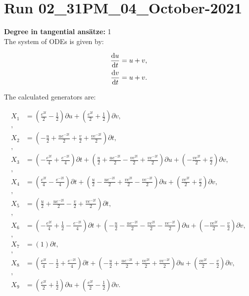\section*{Run 02\_31PM\_04\_October-2021}
\textbf{Degree in tangential ansätze:}	1\\
The system of ODEs is given by:

\begin{align*}
\dv{u}{t}&=u + v,\\
\dv{v}{t}&=u + v.\\
\end{align*}

\noindent The calculated generators are:

\begin{align*}
X_{1}&=\left( \frac{e^{2 t}}{2} - \frac{1}{2} \right)\partial u+\left( \frac{e^{2 t}}{2} + \frac{1}{2} \right)\partial v,\\
,\\
X_{2}&=\left( - \frac{u}{2} + \frac{u e^{- 2 t}}{2} + \frac{v}{2} + \frac{v e^{- 2 t}}{2} \right)\partial t,\\
,\\
X_{3}&=\left( - \frac{e^{2 t}}{4} + \frac{e^{- 2 t}}{4} \right)\partial t+\left( \frac{u}{2} + \frac{u e^{- 2 t}}{2} - \frac{v e^{2 t}}{2} + \frac{v e^{- 2 t}}{2} \right)\partial u+\left( - \frac{v e^{2 t}}{2} + \frac{v}{2} \right)\partial v,\\
,\\
X_{4}&=\left( \frac{e^{2 t}}{4} - \frac{e^{- 2 t}}{4} \right)\partial t+\left( \frac{u}{2} - \frac{u e^{- 2 t}}{2} + \frac{v e^{2 t}}{2} - \frac{v e^{- 2 t}}{2} \right)\partial u+\left( \frac{v e^{2 t}}{2} + \frac{v}{2} \right)\partial v,\\
,\\
X_{5}&=\left( \frac{u}{2} + \frac{u e^{- 2 t}}{2} - \frac{v}{2} + \frac{v e^{- 2 t}}{2} \right)\partial t,\\
,\\
X_{6}&=\left( - \frac{e^{2 t}}{4} + \frac{1}{2} - \frac{e^{- 2 t}}{4} \right)\partial t+\left( - \frac{u}{2} - \frac{u e^{- 2 t}}{2} - \frac{v e^{2 t}}{2} - \frac{v e^{- 2 t}}{2} \right)\partial u+\left( - \frac{v e^{2 t}}{2} - \frac{v}{2} \right)\partial v,\\
,\\
X_{7}&=\left( 1 \right)\partial t,\\
,\\
X_{8}&=\left( \frac{e^{2 t}}{4} - \frac{1}{2} + \frac{e^{- 2 t}}{4} \right)\partial t+\left( - \frac{u}{2} + \frac{u e^{- 2 t}}{2} + \frac{v e^{2 t}}{2} + \frac{v e^{- 2 t}}{2} \right)\partial u+\left( \frac{v e^{2 t}}{2} - \frac{v}{2} \right)\partial v,\\
,\\
X_{9}&=\left( \frac{e^{2 t}}{2} + \frac{1}{2} \right)\partial u+\left( \frac{e^{2 t}}{2} - \frac{1}{2} \right)\partial v.\\
\end{align*}
